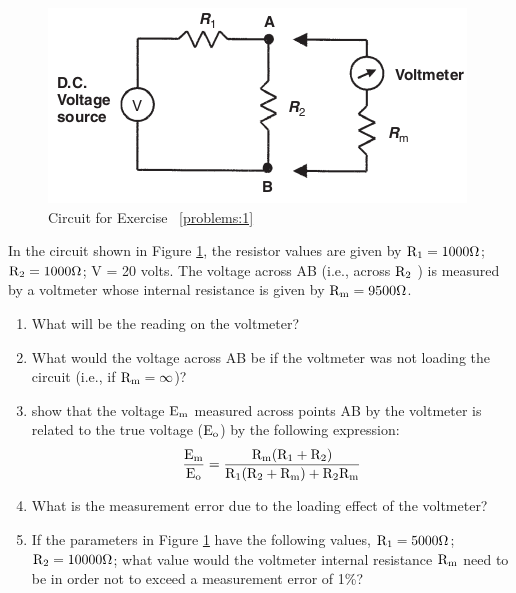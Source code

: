 \documentclass[a4paper,11pt,dvipsnames]{book}
\begin{document}
\begin{question}\label{problems:1}

\begin{figure}[h!]\label{fig:problem}
\centering
  \includegraphics[width=0.8\linewidth]{problem}
  \caption{Circuit for Exercise ~\ref{problems:1}} 
\end{figure}

In the circuit shown in Figure \ref{fig:problem}, the resistor values are given by $\rm R_1 = 1000 \Omega$; $ \rm R_2 = 1000 \Omega$; V = 20 volts. The voltage across AB (i.e., across $\rm R_2$ ) is measured by a
voltmeter whose internal resistance is given by $\rm R_m = 9500 \Omega$.
\begin{enumerate}
\item What will be the reading on the voltmeter?
\item What would the voltage across AB be if the voltmeter was not loading the circuit (i.e., if $\rm R_m = \infty $)?
\item show that the voltage $\rm E_m$ measured across points AB by the voltmeter is related to the true voltage ($\rm E_o$) by the following expression:
\begin{equation}
\rm \frac{E_m}{E_o} = \frac{R_m( R_1 + R_2 )}{R_1(R_2+R_m)+R_2 R_m}
\end{equation}
\item What is the measurement error due to the loading effect of the voltmeter?
\item If the parameters in Figure \ref{fig:problem} have the following values, $\rm R_1 = 5000 \Omega$; $\rm R_2 = 10000 \Omega$; what value would the voltmeter internal resistance $\rm R_m$ need to be in order not to exceed a measurement error of 1\%?
\end{enumerate}
\examspace*{20em}

\end{question}
\begin{solution}


\end{solution}
\end{document}
